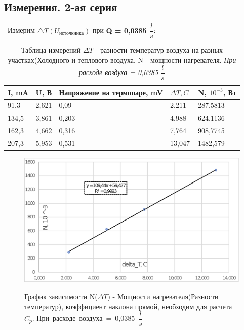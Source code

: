 \documentclass[a4paper,12pt]{article}
\theoremstyle{plain} %
\theoremstyle{definition} %
\theoremstyle{remark} %
\begin{document}
\subsection{Измерения. 2-ая серия}\
Измерим $\triangle T (U_{источкника})$ при \textbf{\large{Q =  0,0385 $\dfrac{l}{s}$}}:

\begin{table}[h]
\centering
\caption{Таблица измерений $\Delta T$ - разности температур воздуха на разных участках(Холодного и теплового воздуха, N - мощности нагревателя. \textit{При  расходе воздуха = 0,0385 $\dfrac{l}{s}$}}
\label{tab:tab2}
\begin{tabular}{|l|l|l|l|l|}
\hline
I, mA & U, В  & Напряжение на термопаре, mV & $\Delta T, C^\circ$ & N, $10^{ -3}$, Вт \\ \hline
91,3  & 2,621 & 0,09                        & 2,211               & 287,5813                 \\
134,5 & 3,861 & 0,203                       & 4,988               & 624,1136                 \\
162,3 & 4,662 & 0,316                       & 7,764               & 908,7745                 \\
207,3 & 5,953 & 0,531                       & 13,047              & 1482,579                 \\ \hline
\end{tabular}
\end{table}

\begin{figure}[H]
{\includegraphics[width=1\linewidth]{graph2.eps}}
\caption{График зависимости N($\Delta T$) - Мощности нагревателя(Разности температур), коэффициент наклона прямой, необходим для расчета $C_p$.
\mbox{При  расходе воздуха = 0,0385 $\dfrac{l}{s}$}}
\end{figure}
\end{document}
